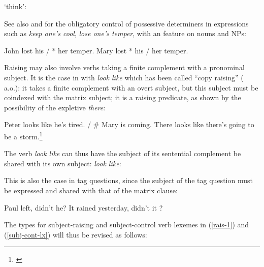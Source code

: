 \documentclass[output=paper
	        ,collection
	        ,collectionchapter
 	        ,biblatex
                ,babelshorthands
                ,newtxmath
                ,draftmode
                ,colorlinks, citecolor=brown
]{langscibook}
\begin{document}
\begin{exe}
\ex {} `think':\\
\end{exe}

 See also  and  for the obligatory control of possessive determiners in  expressions such as \emph{keep one's cool}, \emph{lose one's temper}, with an \xarg feature on nouns and NPs:
\begin{exe}
\ex \begin{xlist}
\ex John lost his / * her temper.
\ex Mary lost * his / her temper.
\end{xlist}
\end{exe}

Raising may also involve verbs taking a finite complement with a pronominal subject. It is the case in  with \emph{look like} which has been called ``copy raising'' (\citealp{Rogers74a-u,Hornstein99a-u} a.o.): it takes a finite complement with an overt subject, but this subject must be coindexed with the matrix subject; it is a raising predicate, as shown by the possibility of the expletive \emph{there}:

\eal
\ex Peter looks like he's tired. / \# Mary is coming.
\ex There looks like there's going to be a storm.\footnote{
\citet[]{Sag2007a}
}
\zl

The verb \emph{look like} can thus have the subject of its sentential complement  be shared with its
own subject:
\ea
\emph{look like}:\\
\avm{
[ \argst < \1, S[xarg & \1] > ]}
\z

This is also the case in  tag questions, since the subject of the tag question must be expressed and shared with that of the matrix clause: 

\eal
\ex Paul left, didn't he?
\ex It rained yesterday, didn't it ?
\zl


The types for subject-raising and subject-control verb lexemes in (\ref{rais-1}) and (\ref{subj-cont-lx}) will thus be revised as follows:\\
\eal
\ex {}  \impl \avm{ [\argst \1 \+ < [x-arg & \1 ] > ] } 
\ex {} \impl {}
\zl
\end{document}
